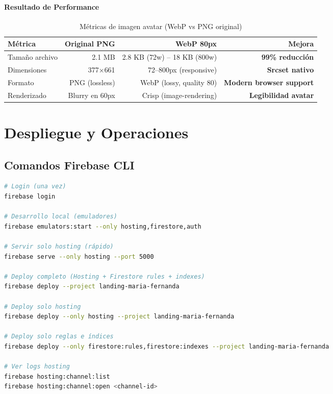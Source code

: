 \documentclass[12pt,a4paper,spanish]{report}
\begin{document}
\subsubsection{Resultado de Performance}
\begin{table}[H]
    \centering
    \caption{Métricas de imagen avatar (WebP vs PNG original)}
    \label{tab:img-perf}
    \begin{tabular}{lrrr}
        \toprule
        \textbf{Métrica} & \textbf{Original PNG} & \textbf{WebP 80px} & \textbf{Mejora} \\
        \midrule
        Tamaño archivo & 2.1 MB & 2.8 KB (72w) -- 18 KB (800w) & \textbf{99\% reducción} \\
        Dimensiones & 377$\times$661 & 72--800px (responsive) & \textbf{Srcset nativo} \\
        Formato & PNG (lossless) & WebP (lossy, quality 80) & \textbf{Modern browser support} \\
        Renderizado & Blurry en 60px & Crisp (image-rendering) & \textbf{Legibilidad avatar} \\
        \bottomrule
    \end{tabular}
\end{table}

\chapter{Despliegue y Operaciones}
\label{ch:despliegue}

\section{Comandos Firebase CLI}
\begin{lstlisting}[language=bash, caption={Comandos de despliegue}]
# Login (una vez)
firebase login

# Desarrollo local (emuladores)
firebase emulators:start --only hosting,firestore,auth

# Servir solo hosting (rápido)
firebase serve --only hosting --port 5000

# Deploy completo (Hosting + Firestore rules + indexes)
firebase deploy --project landing-maria-fernanda

# Deploy solo hosting
firebase deploy --only hosting --project landing-maria-fernanda

# Deploy solo reglas e índices
firebase deploy --only firestore:rules,firestore:indexes --project landing-maria-fernanda

# Ver logs hosting
firebase hosting:channel:list
firebase hosting:channel:open <channel-id>
\end{lstlisting}
\end{document}
